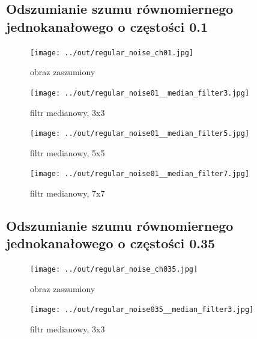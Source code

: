 \documentclass[a4paper,12pt]{article}
\begin{document}
\newpage
\subsection{Odszumianie szumu równomiernego jednokanałowego o częstości 0.1}
\begin{figure}[h!]
\begin{minipage}[t]{7.5cm}
\begin{center}
\texttt{[image: ../out/regular\_noise\_ch01.jpg]}
\caption{obraz zaszumiony}
\end{center}
\end{minipage}
\hfill
\begin{minipage}[t]{7.5cm}
\begin{center}
\texttt{[image: ../out/regular\_noise01\_\_median\_filter3.jpg]}
\caption{filtr medianowy, 3x3}
\end{center}
\end{minipage}
\end{figure}

\begin{figure}[h!]
\begin{minipage}[t]{7.5cm}
\begin{center}
\texttt{[image: ../out/regular\_noise01\_\_median\_filter5.jpg]}
\caption{filtr medianowy, 5x5}
\end{center}
\end{minipage}
\hfill
\begin{minipage}[t]{7.5cm}
\begin{center}
\texttt{[image: ../out/regular\_noise01\_\_median\_filter7.jpg]}
\caption{filtr medianowy, 7x7}
\end{center}
\end{minipage}
\end{figure}


\newpage
\subsection{Odszumianie szumu równomiernego jednokanałowego o częstości 0.35}
\begin{figure}[h!]
\begin{minipage}[t]{7.5cm}
\begin{center}
\texttt{[image: ../out/regular\_noise\_ch035.jpg]}
\caption{obraz zaszumiony}
\end{center}
\end{minipage}
\hfill
\begin{minipage}[t]{7.5cm}
\begin{center}
\texttt{[image: ../out/regular\_noise035\_\_median\_filter3.jpg]}
\caption{filtr medianowy, 3x3}
\end{center}
\end{minipage}
\end{figure}
\end{document}
